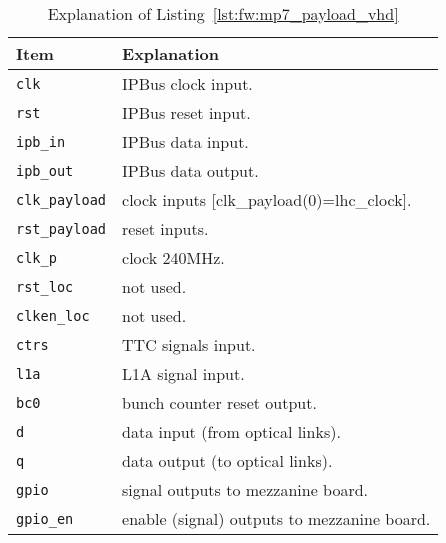 \medskip
\begin{table}
\footnotesize
\caption{Explanation of Listing~\ref{lst:fw:mp7_payload_vhd}}
\vspace{5mm}
\centering
\begin{tabular}{l p{}}
\toprule
{Item} & {Explanation}\\
\midrule
\verb|clk| & IPBus clock input.\\
\verb|rst| & IPBus reset input.\\
\verb|ipb_in| & IPBus data input.\\
\verb|ipb_out| & IPBus data output.\\
\verb|clk_payload| & clock inputs [clk\_payload(0)=lhc\_clock].\\
\verb|rst_payload| & reset inputs.\\
\verb|clk_p| & clock 240MHz.\\
\verb|rst_loc| & not used.\\
\verb|clken_loc| & not used.\\
\verb|ctrs| & TTC signals input.\\
\verb|l1a| & L1A signal input.\\
\verb|bc0| & bunch counter reset output.\\
\verb|d| & data input (from optical links).\\
\verb|q| & data output (to optical links).\\
\verb|gpio| & signal outputs to mezzanine board.\\
\verb|gpio_en| & enable (signal) outputs to mezzanine board.\\
\bottomrule
\end{tabular}
\label{tab:gtl:explanation_mp7_payload_vhd}
\end{table}

\clearpage

%
%
% 
%

